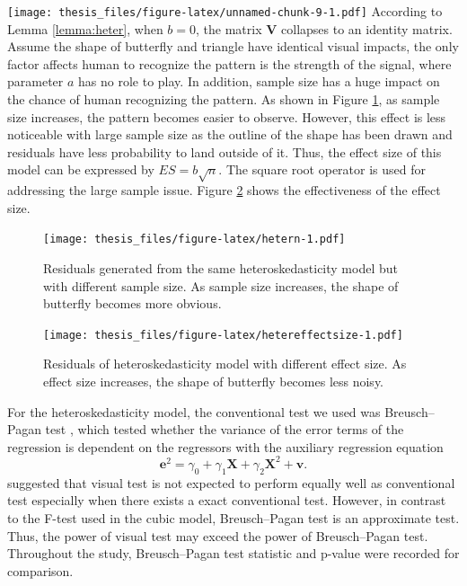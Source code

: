 \documentclass{monashthesis}
\theoremstyle{definition}
\theoremstyle{definition}
\theoremstyle{definition}
\theoremstyle{definition}
\theoremstyle{remark}
\begin{document}
\texttt{[image: thesis\_files/figure-latex/unnamed-chunk-9-1.pdf]}
According to Lemma \ref{lemma:heter}, when \(b = 0\), the matrix \(\boldsymbol{V}\) collapses to an identity matrix. Assume the shape of butterfly and triangle have identical visual impacts, the only factor affects human to recognize the pattern is the strength of the signal, where parameter \(a\) has no role to play. In addition, sample size has a huge impact on the chance of human recognizing the pattern. As shown in Figure \ref{fig:hetern}, as sample size increases, the pattern becomes easier to observe. However, this effect is less noticeable with large sample size as the outline of the shape has been drawn and residuals have less probability to land outside of it. Thus, the effect size of this model can be expressed by \(ES = b\sqrt{n}\). The square root operator is used for addressing the large sample issue. Figure \ref{fig:hetereffectsize} shows the effectiveness of the effect size.

\begin{figure}
\centering
\texttt{[image: thesis\_files/figure-latex/hetern-1.pdf]}
\caption{\label{fig:hetern}Residuals generated from the same heteroskedasticity model but with different sample size. As sample size increases, the shape of butterfly becomes more obvious.}
\end{figure}

\begin{figure}
\centering
\texttt{[image: thesis\_files/figure-latex/hetereffectsize-1.pdf]}
\caption{\label{fig:hetereffectsize}Residuals of heteroskedasticity model with different effect size. As effect size increases, the shape of butterfly becomes less noisy.}
\end{figure}

For the heteroskedasticity model, the conventional test we used was Breusch--Pagan test \autocite{breusch_simple_1979}, which tested whether the variance of the error terms of the regression is dependent on the regressors with the auxiliary regression equation \[\boldsymbol{e}^2 = \gamma_0 + \gamma_1 \boldsymbol{X} + \gamma_2 \boldsymbol{X}^2 + \boldsymbol{v}.\] \textcite{majumder_validation_2013} suggested that visual test is not expected to perform equally well as conventional test especially when there exists a exact conventional test. However, in contrast to the F-test used in the cubic model, Breusch--Pagan test is an approximate test. Thus, the power of visual test may exceed the power of Breusch--Pagan test. Throughout the study, Breusch--Pagan test statistic and p-value were recorded for comparison.
\end{document}
